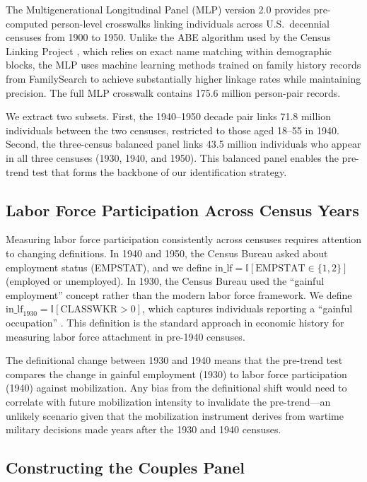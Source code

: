 \documentclass[12pt]{article}
\newcommand{\ind}{\mathbb{I}}
\begin{document}
The Multigenerational Longitudinal Panel (MLP) version 2.0 \citep{helgertz2023mlp} provides pre-computed person-level crosswalks linking individuals across U.S.\ decennial censuses from 1900 to 1950. Unlike the ABE algorithm used by the Census Linking Project \citep{abramitzky2025clp}, which relies on exact name matching within demographic blocks, the MLP uses machine learning methods trained on family history records from FamilySearch to achieve substantially higher linkage rates while maintaining precision. The full MLP crosswalk contains 175.6 million person-pair records.

We extract two subsets. First, the 1940--1950 decade pair links 71.8 million individuals between the two censuses, restricted to those aged 18--55 in 1940. Second, the three-census balanced panel links 43.5 million individuals who appear in all three censuses (1930, 1940, and 1950). This balanced panel enables the pre-trend test that forms the backbone of our identification strategy.

\subsection{Labor Force Participation Across Census Years}

Measuring labor force participation consistently across censuses requires attention to changing definitions. In 1940 and 1950, the Census Bureau asked about employment status (EMPSTAT), and we define $\text{in\_lf} = \ind[\text{EMPSTAT} \in \{1, 2\}]$ (employed or unemployed). In 1930, the Census Bureau used the ``gainful employment'' concept rather than the modern labor force framework. We define $\text{in\_lf}_{1930} = \ind[\text{CLASSWKR} > 0]$, which captures individuals reporting a ``gainful occupation'' \citep{goldin1990understanding}. This definition is the standard approach in economic history for measuring labor force attachment in pre-1940 censuses.

The definitional change between 1930 and 1940 means that the pre-trend test compares the change in gainful employment (1930) to labor force participation (1940) against mobilization. Any bias from the definitional shift would need to correlate with future mobilization intensity to invalidate the pre-trend---an unlikely scenario given that the mobilization instrument derives from wartime military decisions made years after the 1930 and 1940 censuses.

\subsection{Constructing the Couples Panel}
\end{document}
